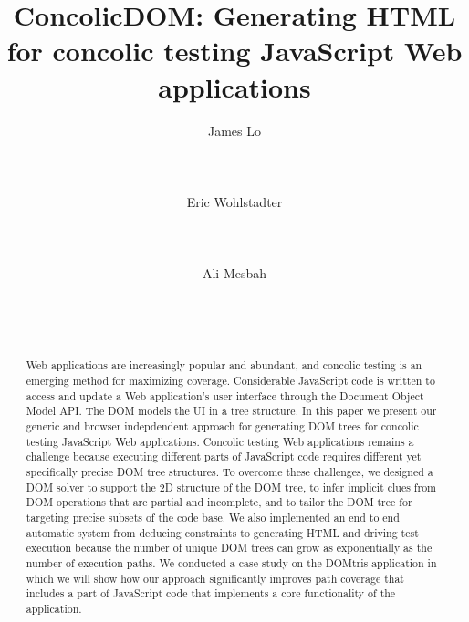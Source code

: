 \documentclass{sig-alternate}
\begin{document}


\title{{\ttlit ConcolicDOM:} Generating HTML for concolic testing JavaScript Web applications}
\author{
\alignauthor
James Lo\\	
       \\
       \\	   
       \\
\alignauthor
Eric Wohlstadter\\
       \\
       \\	   
       \\
\alignauthor
Ali Mesbah\\
       \\
       \\	   
       \\
}

\maketitle
\begin{abstract}
Web applications are increasingly popular and abundant, and concolic testing is an emerging method for maximizing coverage.  
Considerable JavaScript code is written to access and update a Web application's user interface through the Document Object Model API.  The DOM models the UI in a tree structure.  In this paper we present our generic and browser indepdendent approach for generating DOM trees for concolic testing JavaScript Web applications.
Concolic testing Web applications remains a challenge because executing different parts of JavaScript code requires different yet specifically precise DOM tree structures.
To overcome these challenges, we designed a DOM solver to support the 2D structure of the DOM tree, to infer implicit clues from DOM operations that are partial and incomplete, and to tailor the DOM tree for targeting precise subsets of the code base.
We also implemented an end to end automatic system from deducing constraints to generating HTML and driving test execution because the number of unique DOM trees can grow as exponentially as the number of execution paths.
We conducted a case study on the DOMtris application in which we will show how our approach significantly improves path coverage that includes a part of JavaScript code that implements a core functionality of the application.
\end{abstract}
\end{document}
